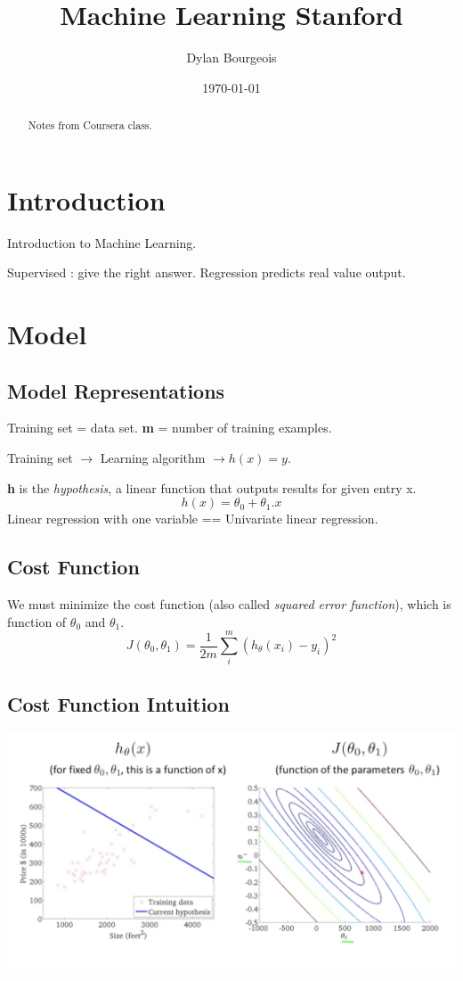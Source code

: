 \documentclass[a4paper]{article}
\title{Machine Learning Stanford}
\author{Dylan Bourgeois}
\date{\today}
\begin{document}
\maketitle

\begin{abstract}
Notes from Coursera class.
\end{abstract}

\section{Introduction}

Introduction to Machine Learning.

Supervised : give the right answer. Regression predicts real value output.

\section{Model}
\label{sec:examples}

\subsection{Model Representations}

Training set = data set. \textbf{m} = number of training examples.

Training set $\to $ Learning algorithm $\to h(x)=y$. 

\textbf{h} is the \textit{hypothesis}, a linear function that outputs results for given entry x. 
$$h(x) = \theta_0 + \theta_1.x $$  
Linear regression with one variable == Univariate linear regression. 

\subsection{Cost Function}

We must minimize the cost function (also called \textit{squared error function}), which is function of $\theta_0$ and $\theta_1$.
$$J(\theta_0, \theta_1) = \frac{1}{2m}\sum_{i}^{m} (h_\theta (x_i)-y_i)^2$$

\subsection{Cost Function Intuition}

\includegraphics[scale=0.35]{MLS.png}
\end{document}
